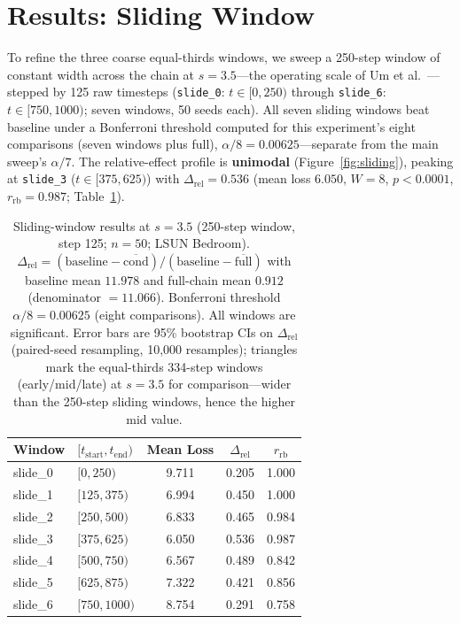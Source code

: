 \documentclass[10pt]{article}
\begin{document}
\section{Results: Sliding Window}
\label{sec:sliding}

To refine the three coarse equal-thirds windows, we sweep a 250-step window of
constant width across the chain at $s=3.5$---the operating scale of Um et
al.~\cite{um2024minority}---stepped by 125 raw timesteps
(\texttt{slide\_0}: $t\!\in\![0,250)$ through \texttt{slide\_6}:
$t\!\in\![750,1000)$; seven windows, 50 seeds each).  All seven sliding windows
beat baseline under a Bonferroni threshold computed for this experiment's eight
comparisons (seven windows plus full), $\alpha/8=0.00625$---separate from the
main sweep's $\alpha/7$.  The relative-effect profile is
\textbf{unimodal} (Figure~\ref{fig:sliding}), peaking at \texttt{slide\_3}
($t\!\in\![375,625)$) with $\Delta_\mathrm{rel}=0.536$ (mean loss $6.050$,
$W=8$, $p<0.0001$, $r_\mathrm{rb}=0.987$; Table~\ref{tab:sliding}).

\begin{table}[h]
\centering
\caption{Sliding-window results at $s=3.5$ (250-step window, step 125; $n=50$;
LSUN Bedroom).  $\Delta_\mathrm{rel}=(\text{baseline}-\overline{\text{cond}})/
(\text{baseline}-\overline{\text{full}})$ with baseline mean $11.978$ and
full-chain mean $0.912$ (denominator $=11.066$).  Bonferroni threshold $\alpha/8=0.00625$
(eight comparisons).  All windows are significant.  Error bars are 95\% bootstrap
CIs on $\Delta_\mathrm{rel}$ (paired-seed resampling, 10{,}000 resamples);
triangles mark the equal-thirds 334-step windows (early/mid/late) at $s=3.5$
for comparison---wider than the 250-step sliding windows, hence the higher mid value.}
\label{tab:sliding}
\renewcommand{\arraystretch}{1.1}
\begin{tabular}{@{}llccc@{}}
\toprule
\textbf{Window} & \textbf{$[t_\mathrm{start},t_\mathrm{end})$} &
  \textbf{Mean Loss} & \textbf{$\Delta_\mathrm{rel}$} & \textbf{$r_\mathrm{rb}$} \\
\midrule
slide\_0 & $[0,250)$    & 9.711 & 0.205 & 1.000 \\
slide\_1 & $[125,375)$  & 6.994 & 0.450 & 1.000 \\
slide\_2 & $[250,500)$  & 6.833 & 0.465 & 0.984 \\
slide\_3 & $[375,625)$  & 6.050 & 0.536 & 0.987 \\
slide\_4 & $[500,750)$  & 6.567 & 0.489 & 0.842 \\
slide\_5 & $[625,875)$  & 7.322 & 0.421 & 0.856 \\
slide\_6 & $[750,1000)$ & 8.754 & 0.291 & 0.758 \\
\bottomrule
\end{tabular}
\end{table}
\end{document}
